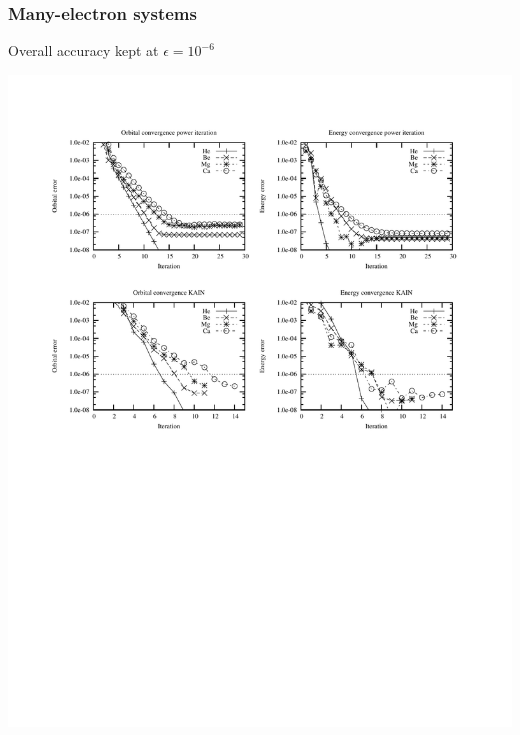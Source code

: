 \documentclass[mathserif, 10pt]{beamer}
\begin{document}
\begin{frame}
    \frametitle{Many-electron systems}
    \centering
    Overall accuracy kept at $\epsilon = 10^{-6}$
    \begin{center}
	\includegraphics[scale=0.6, clip, viewport = 50 550 550 740]{figures/accuracy.pdf}
    \end{center}
\end{frame}
\end{document}
